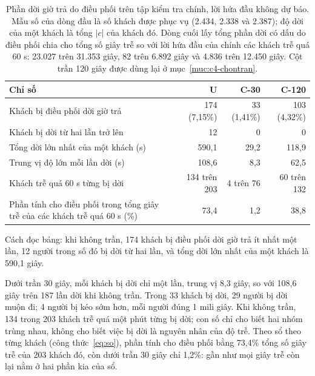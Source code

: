 \begin{table}[htbp]
\centering
\caption[Phần dời giờ trả do điều phối trên tập kiểm tra chính]{Phần dời giờ trả do điều phối trên tập kiểm tra chính, lời hứa đầu không dự báo. Mẫu số của
dòng đầu là số khách được phục vụ (2.434, 2.338 và 2.387); độ dời của một khách là tổng $|c|$ của khách
đó. Dòng cuối lấy tổng phần dời có dấu do điều phối chia cho tổng số giây trễ so với lời hứa đầu của chính các khách
trễ quá 60 s: 23.027 trên 31.353 giây, 82 trên 6.892 giây và 4.836 trên 12.450 giây. Cột trần 120 giây được dùng
lại ở mục~\ref{muc:c4-chontran}.}
\label{bang:c4-doidieuphoi}
\small
\begin{tabular}{@{}p{7.6cm}rrr@{}}
\toprule
\textbf{Chỉ số} & \textbf{U} & \textbf{C-30} & \textbf{C-120}\\
\midrule
Khách bị điều phối dời giờ trả & 174 (7,15\%) & 33 (1,41\%) & 103 (4,32\%)\\
Khách bị dời từ hai lần trở lên & 12 & 0 & 0\\
Tổng dời lớn nhất của một khách (s) & 590,1 & 29,2 & 118,9\\
Trung vị độ lớn mỗi lần dời (s) & 108,6 & 8,3 & 62,5\\
Khách trễ quá 60 s từng bị dời & 134 trên 203 & 4 trên 76 & 60 trên 132\\
Phần tính cho điều phối trong tổng giây trễ của các khách trễ quá 60 s (\%) & 73,4 & 1,2 & 38,8\\
\bottomrule
\end{tabular}
\end{table}

Cách đọc bảng: khi không trần, 174 khách bị điều phối dời giờ trả ít nhất một lần, 12 người trong số đó bị dời từ hai
lần, và tổng dời lớn nhất của một khách là 590,1 giây.

Dưới trần 30 giây, mỗi khách bị dời chỉ một lần, trung vị 8,3 giây, so với 108,6 giây trên 187 lần dời khi không trần.
Trong 33 khách bị dời, 29 người bị dời muộn đi; 4 người bị kéo sớm hơn, mỗi người đúng 1 mili giây. Khi không trần,
134 trong 203 khách trễ quá một phút từng bị dời; con số chỉ cho biết hai nhóm trùng nhau, không cho biết việc bị dời
là nguyên nhân của độ trễ. Theo sổ theo từng khách (công thức~\eqref{eq:so}), phần tính cho điều phối bằng 73,4\% tổng
số giây trễ của 203 khách đó, còn dưới trần 30 giây chỉ 1,2\%: gần như mọi giây trễ còn lại nằm ở hai phần kia của sổ.

